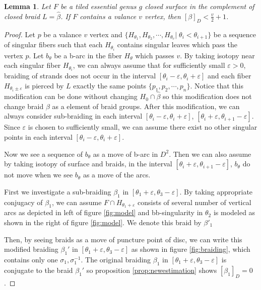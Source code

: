 \documentclass[12pt]{amsart}
\newtheorem{lem}{Lemma}
\begin{document}
\begin{lem}
\label{lem:estimate-tiled}
   Let $F$ be a tiled essential genus $g$ closed surface in the complement of closed braid $L=\widehat{\beta}$. If $F$ contains a valance $v$ vertex, then $[\beta]_{D} < \frac{v}{2}+1$.
\end{lem}
\begin{proof}
 
  
   Let $p$ be a valance $v$ vertex and $ \{H_{\theta_{1}},H_{\theta_{2}},\cdots ,H_{\theta_{v}} |\; \theta_{i}<\theta_{i+1} \} $ be a sequence of singular fibers such that each $H_{\theta_{i}}$ contains singular leaves which pass the vertex $p$. Let $b_{\theta}$ be a b-arc in the fiber $H_{\theta}$ which passes $v$. By taking isotopy near each singular fiber $H_{\theta_{i}}$, we can always assume 
that for sufficiently small $\varepsilon > 0 $, braiding of strands does not occur in the interval $[\theta_{i}-\varepsilon, \theta_{i}+\varepsilon]$ and each fiber $H_{\theta_{i} \pm \varepsilon}$ is pierced by $L$ exactly the same points $\{p_{1},p_{2},\cdots,p_{n}\}$. Notice that this modification can be done without changing $H_{0}\cap \widehat{\beta}$ so this modification does not change braid $\beta$ as a element of braid groups. After this modification, we can always consider sub-braiding in each interval $[\theta_{i} - \varepsilon,\theta_{i}+\varepsilon]$, $[\theta_{i}+\varepsilon, \theta_{i+1}-\varepsilon]$.
Since $\varepsilon$ is chosen to sufficiently small, we can assume there exist no other singular points in each interval $[\theta_{i}-\varepsilon, \theta_{i}+\varepsilon]$. 

Now we see a sequence of $b_{\theta}$ as a move of b-arc in $D^{2}$. Then we can also assume by taking isotopy of surface and braids, in the interval $[\theta_{i}+\varepsilon, \theta_{i+1}-\varepsilon]$, $b_{\theta}$ do not move when we see $b_{\theta}$ as a move of the arcs. 
   
 First we investigate a sub-braiding $\beta_{1}$ in $[\theta_{1}+\varepsilon, \theta_{3}-\varepsilon] $.
 By taking appropriate conjugacy of $\beta_{1}$, we can assume $F \cap H_{\theta_{1} + \varepsilon}$ consists of several number of vertical arcs as depicted in left of figure \ref{fig:model} and bb-singularity in $\theta_{2}$ is modeled as shown in the right of figure \ref{fig:model}. We denote this braid by $\beta'_{1}$
 
 
  Then, by seeing braids as a move of puncture point of disc, we can write this modified braiding $\beta_{1}'$ in $[\theta_{1}+\varepsilon, \theta_{3}-\varepsilon]$ as shown in figure \ref{fig:braiding}, 
which contains only one $\sigma_{1},\sigma_{1}^{-1}$. The original braiding $\beta_{1}$ in $[\theta_{1}+\varepsilon, \theta_{3}-\varepsilon]$ is conjugate to the braid $\beta_{1}'$ so proposition \ref{prop:newestimation} shows $[\beta_{1}]_{D} =0$.



\end{proof}
\end{document}
